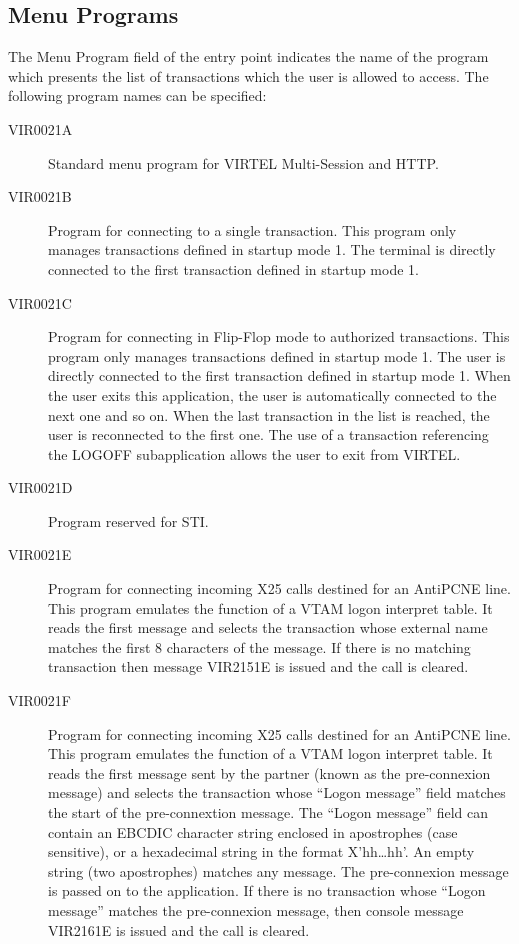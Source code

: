 \documentclass[letterpaper,10pt,english]{sphinxmanual}
\begin{document}
\subsection{Menu Programs}
\label{\detokenize{connectivity_guide:menu-programs}}\label{\detokenize{connectivity_guide:index-111}}
The Menu Program field of the entry point indicates the name of the program which presents the list of transactions which the user is allowed to access. The following program names can be specified:
\begin{description}
\item[{VIR0021A}] \leavevmode
Standard menu program for VIRTEL Multi-Session and HTTP.

\item[{VIR0021B}] \leavevmode
Program for connecting to a single transaction. This program only manages transactions defined in startup mode 1. The terminal is directly connected to the first transaction defined in startup mode 1.

\item[{VIR0021C}] \leavevmode
Program for connecting in Flip-Flop mode to authorized transactions. This program only manages transactions defined in startup mode 1. The user is directly connected to the first transaction defined in startup mode 1. When the user exits this application, the user is automatically connected to the next one and so on. When the last transaction in the list is reached, the user is reconnected to the first one. The use of a transaction referencing the LOGOFF subapplication allows the user to exit from VIRTEL.

\item[{VIR0021D}] \leavevmode
Program reserved for STI.

\item[{VIR0021E}] \leavevmode
Program for connecting incoming X25 calls destined for an AntiPCNE line. This program emulates the function of a VTAM logon interpret table. It reads the first message and selects the transaction whose external name matches the first 8 characters of the message. If there is no matching transaction then message VIR2151E is issued and the call is cleared.

\item[{VIR0021F}] \leavevmode
Program for connecting incoming X25 calls destined for an AntiPCNE line. This program emulates the function of a VTAM logon interpret table. It reads the first message sent by the partner (known as the pre-connexion message) and selects the transaction whose “Logon message” field matches the start of the pre-connextion message. The “Logon message” field can contain an EBCDIC character string enclosed in apostrophes (case sensitive), or a hexadecimal string in the format X’hh…hh’. An empty string (two apostrophes) matches any message. The pre-connexion message is passed on to the application. If there is no transaction whose “Logon message” matches the pre-connexion message, then console message VIR2161E is issued and the call is cleared.


\end{description}
\end{document}
